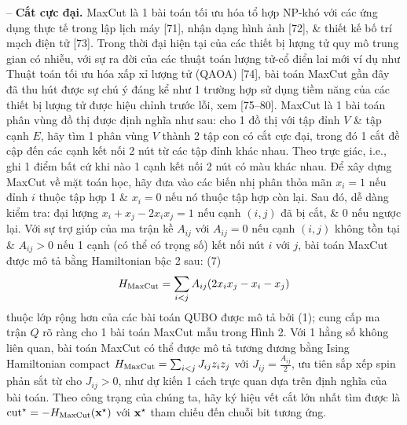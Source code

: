 \documentclass{article}
\begin{document}
\begin{itemize}
    -- {\bf Cắt cực đại.} MaxCut là 1 bài toán tối ưu hóa tổ hợp NP-khó với các ứng dụng thực tế trong lập lịch máy [71], nhận dạng hình ảnh [72], \& thiết kế bố trí mạch điện tử [73]. Trong thời đại hiện tại của các thiết bị lượng tử quy mô trung gian có nhiễu, với sự ra đời của các thuật toán lượng tử-cổ điển lai mới ví dụ như Thuật toán tối ưu hóa xấp xỉ lượng tử (QAOA) [74], bài toán MaxCut gần đây đã thu hút được sự chú ý đáng kể như 1 trường hợp sử dụng tiềm năng của các thiết bị lượng tử được hiệu chỉnh trước lỗi, xem [75--80]. MaxCut là 1 bài toán phân vùng đồ thị được định nghĩa như sau: cho 1 đồ thị với tập đỉnh $V$ \& tập cạnh $E$, hãy tìm 1 phân vùng $V$ thành 2 tập con có cắt cực đại, trong đó 1 cắt đề cập đến các cạnh kết nối 2 nút từ các tập đỉnh khác nhau. Theo trực giác, i.e., ghi 1 điểm bất cứ khi nào 1 cạnh kết nối 2 nút có màu khác nhau. Để xây dựng MaxCut về mặt toán học, hãy đưa vào các biến nhị phân thỏa mãn $x_i = 1$ nếu đỉnh $i$ thuộc tập hợp 1 \& $x_i = 0$ nếu nó thuộc tập hợp còn lại. Sau đó, dễ dàng kiểm tra: đại lượng $x_i + x_j - 2x_ix_j = 1$ nếu cạnh $(i,j)$ đã bị cắt, \& 0 nếu ngược lại. Với sự trợ giúp của ma trận kề $A_{ij}$ với $A_{ij} = 0$ nếu cạnh $(i,j)$ không tồn tại \& $A_{ij} > 0$ nếu 1 cạnh (có thể có trọng số) kết nối nút $i$ với $j$, bài toán MaxCut được mô tả bằng Hamiltonian bậc 2 sau: (7)
    \begin{equation*}
        H_{\rm MaxCut} = \sum_{i < j} A_{ij}(2x_ix_j - x_i - x_j)
    \end{equation*}
    thuộc lớp rộng hơn của các bài toán QUBO được mô tả bởi (1); cung cấp ma trận $Q$ rõ ràng cho 1 bài toán MaxCut mẫu trong {\sf Hình 2}. Với 1 hằng số không liên quan, bài toán MaxCut có thể được mô tả tương đương bằng Ising Hamiltonian compact $H_{\rm MaxCut} = \sum_{i < j} J_{ij}z_iz_j$ với $J_{ij} = \frac{A_{ij}}{2}$, ưu tiên sắp xếp spin phản sắt từ cho $J_{ij} > 0$, như dự kiến 1 cách trực quan dựa trên định nghĩa của bài toán. Theo công trạng của chúng ta, hãy ký hiệu vết cắt lớn nhất tìm được là ${\rm cut}^\star = -H_{\rm MaxCut}({\bf x}^\star)$ với ${\bf x}^\star$ tham chiếu đến chuỗi bit tương ứng.


\end{itemize}
\end{document}
